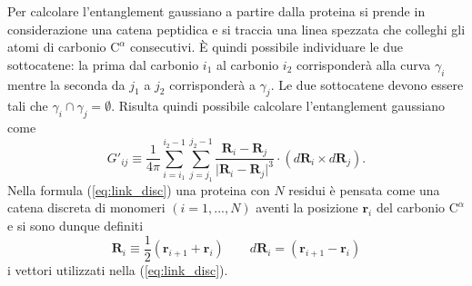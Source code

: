Per calcolare l'entanglement gaussiano a partire dalla proteina si prende in considerazione una catena peptidica e si traccia una linea spezzata che colleghi gli atomi di carbonio $ \mathrm{C}^{\alpha} $ consecutivi. È quindi possibile individuare le due sottocatene: la prima dal carbonio $ i_1 $ al carbonio $ i_2 $ corrisponderà alla curva $ \gamma_i $ mentre la seconda da $ j_1 $ a $ j_2 $ corrisponderà a $ \gamma_j $. Le due sottocatene devono essere tali che $ \gamma_i \cap \gamma_j = \emptyset $.
Risulta quindi possibile calcolare l'entanglement gaussiano come
\begin{equation}
G'_{ij} \equiv \frac{1}{4 \pi} \sum_{i=i_1}^{i_2-1} \sum_{j=j_1}^{j_2-1} \frac{\mathbf{R}_i - \mathbf{R}_j}{ \lvert \mathbf{R}_i - \mathbf{R}_j \rvert^3} \cdot (d\mathbf{R}_i \times d\mathbf{R}_j).
\label{eq:link_disc}
\end{equation}
Nella formula (\ref{eq:link_disc}) una proteina con $ N $ residui è pensata come una catena discreta di monomeri $ \left( i=1,...,N \right) $ aventi la posizione $ \mathbf{r}_i $ del carbonio $ \mathrm{C}^{\alpha} $ e si sono dunque definiti
\begin{equation}
\mathbf{R}_i \equiv \frac{1}{2} \left( \mathbf{r}_{i+1} + \mathbf{r}_i \right)
\qquad d\mathbf{R}_i =  \left( \mathbf{r}_{i+1} - \mathbf{r}_i \right)
\label{eq:pos_med}
\end{equation}
i vettori utilizzati nella (\ref{eq:link_disc}). \cite{Baiesi_2017}

  